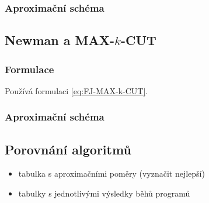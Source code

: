 \subsubsection*{Aproximační schéma}

\subsection{Newman a MAX-$k$-CUT}

\subsubsection*{Formulace}

Používá formulaci \ref{eq:FJ-MAX-k-CUT}.

\subsubsection*{Aproximační schéma}


\subsection{Porovnání algoritmů}

\begin{itemize}
    \item tabulka s aproximačními poměry (vyznačit nejlepší)
    \item tabulky s jednotlivými výsledky běhů programů
\end{itemize}


